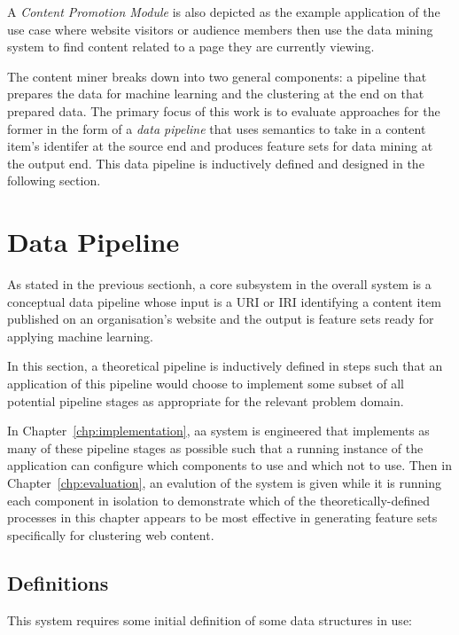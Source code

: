 A \emph{Content Promotion Module} is also depicted as the example application
of the use case where website visitors or audience members then use the
data mining system to find content related to a page they are currently viewing.

The content miner breaks down into two general components: a pipeline
that prepares the data for machine learning and the clustering at the
end on that prepared data. The primary focus of this work is to
evaluate approaches for the former in the form of a
\emph{data pipeline} that uses semantics to take in a content item's
identifer at the source end and produces feature sets for data mining
at the output end. This data pipeline is inductively defined and
designed in the following section.

\section{Data Pipeline}
\label{sec:design-pipeline}

As stated in the previous sectionh, a core subsystem in the overall
system is a conceptual data pipeline whose input is a URI or IRI
identifying a content item published on an organisation's website and
the output is feature sets ready for applying machine learning.

In this section, a theoretical pipeline is inductively defined in
steps such that an application of this pipeline would choose to
implement some subset of all potential pipeline stages as appropriate
for the relevant problem domain.

In Chapter~\ref{chp:implementation}, aa system is engineered that implements
as many of these pipeline stages as possible such that a running instance of
the application can configure which components to use and which not to use.
Then in Chapter~\ref{chp:evaluation}, an evalution of the system is given
while it is running each component in isolation to demonstrate which of the
theoretically-defined processes in this chapter appears to be most effective
in generating feature sets specifically for clustering web content.

\subsection{Definitions}

This system requires some initial definition of some data structures in use:


